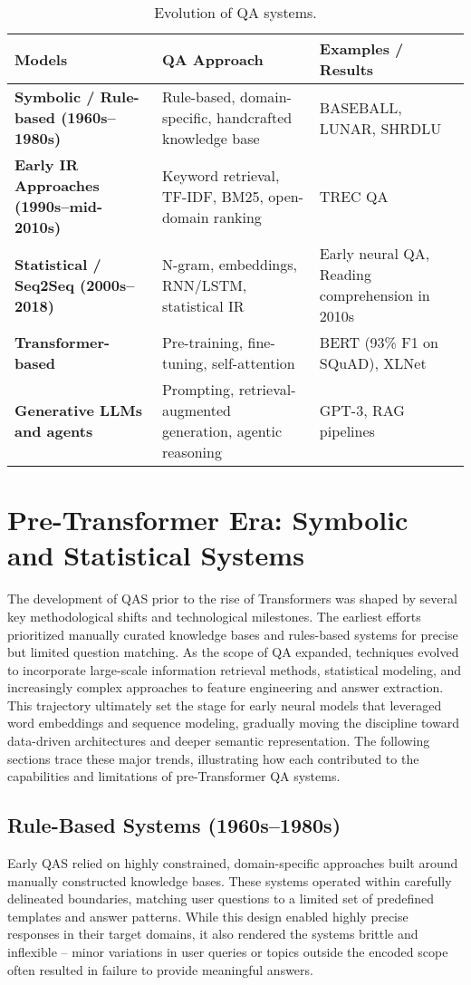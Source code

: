 \begin{spacing}{1.5}
\begin{table}[H]
\centering
\begin{tabularx}{\textwidth}{>{\raggedright\arraybackslash\bfseries}X >{\raggedright\arraybackslash}X >{\raggedright\arraybackslash}X}
\toprule
\textbf{Models} & \textbf{QA Approach} & \textbf{Examples / Results}\\
\midrule
Symbolic / Rule-based (1960s–1980s) & Rule-based, domain-specific, handcrafted knowledge base & BASEBALL, LUNAR, SHRDLU \\
Early IR Approaches (1990s–mid-2010s) & Keyword retrieval, TF-IDF, BM25, open-domain ranking & TREC QA \\
Statistical / Seq2Seq (2000s–2018) & N-gram, embeddings, RNN/LSTM, statistical IR & Early neural QA, Reading comprehension in 2010s \\
Transformer-based & Pre-training, fine-tuning, self-attention & BERT (93\% F1 on SQuAD), XLNet \\
Generative LLMs and agents & Prompting, retrieval-augmented generation, agentic reasoning & GPT-3, RAG pipelines \\
\bottomrule
\end{tabularx}
\caption{Evolution of QA systems.}
\label{tab:qa_evolution}
\end{table}

\section{Pre-Transformer Era: Symbolic and Statistical Systems}
The development of QAS prior to the rise of Transformers was shaped by several key methodological shifts and technological milestones. The earliest efforts prioritized manually curated knowledge bases and rules-based systems for precise but limited question matching. As the scope of QA expanded, techniques evolved to incorporate large-scale information retrieval methods, statistical modeling, and increasingly complex approaches to feature engineering and answer extraction. This trajectory ultimately set the stage for early neural models that leveraged word embeddings and sequence modeling, gradually moving the discipline toward data-driven architectures and deeper semantic representation. The following sections trace these major trends, illustrating how each contributed to the capabilities and limitations of pre-Transformer QA systems.

\subsection{Rule-Based Systems (1960s--1980s)}
Early QAS relied on highly constrained, domain-specific approaches built around manually constructed knowledge bases. These systems operated within carefully delineated boundaries, matching user questions to a limited set of predefined templates and answer patterns. While this design enabled highly precise responses in their target domains, it also rendered the systems brittle and inflexible -- minor variations in user queries or topics outside the encoded scope often resulted in failure to provide meaningful answers.


\end{spacing}
